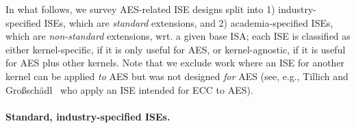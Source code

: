 
In what follows, we survey AES-related ISE designs split into
1) industry-specified ISEs,
   which are {\em     standard} extensions,
   and
2) academia-specified ISEs,
   which are {\em non-standard} extensions,
wrt. a given base ISA; each ISE is classified as either
   kernel-specific,
   if it is only useful for AES,
   or
   kernel-agnostic,
   if it is      useful for AES plus other kernels.
Note that we exclude work where an ISE for another kernel can be applied 
{\em  to} AES
but was not designed 
{\em for} AES
(see, e.g., Tillich and Gro{\ss}sch\"{a}dl~\cite{TilGro:04} who apply an ISE intended for ECC to AES).


\paragraph    {Standard, industry-specified ISEs.}

